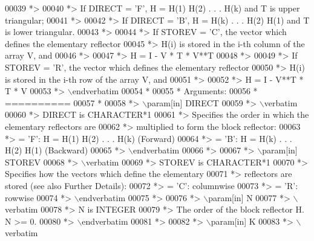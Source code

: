 \begin{DoxyCode}
00039 \textcolor{comment}{*>}
00040 \textcolor{comment}{*> If DIRECT = 'F', H = H(1) H(2) . . . H(k) and T is upper triangular;}
00041 \textcolor{comment}{*>}
00042 \textcolor{comment}{*> If DIRECT = 'B', H = H(k) . . . H(2) H(1) and T is lower triangular.}
00043 \textcolor{comment}{*>}
00044 \textcolor{comment}{*> If STOREV = 'C', the vector which defines the elementary reflector}
00045 \textcolor{comment}{*> H(i) is stored in the i-th column of the array V, and}
00046 \textcolor{comment}{*>}
00047 \textcolor{comment}{*>    H  =  I - V * T * V**T}
00048 \textcolor{comment}{*>}
00049 \textcolor{comment}{*> If STOREV = 'R', the vector which defines the elementary reflector}
00050 \textcolor{comment}{*> H(i) is stored in the i-th row of the array V, and}
00051 \textcolor{comment}{*>}
00052 \textcolor{comment}{*>    H  =  I - V**T * T * V}
00053 \textcolor{comment}{*> \(\backslash\)endverbatim}
00054 \textcolor{comment}{*}
00055 \textcolor{comment}{*  Arguments:}
00056 \textcolor{comment}{*  ==========}
00057 \textcolor{comment}{*}
00058 \textcolor{comment}{*> \(\backslash\)param[in] DIRECT}
00059 \textcolor{comment}{*> \(\backslash\)verbatim}
00060 \textcolor{comment}{*>          DIRECT is CHARACTER*1}
00061 \textcolor{comment}{*>          Specifies the order in which the elementary reflectors are}
00062 \textcolor{comment}{*>          multiplied to form the block reflector:}
00063 \textcolor{comment}{*>          = 'F': H = H(1) H(2) . . . H(k) (Forward)}
00064 \textcolor{comment}{*>          = 'B': H = H(k) . . . H(2) H(1) (Backward)}
00065 \textcolor{comment}{*> \(\backslash\)endverbatim}
00066 \textcolor{comment}{*>}
00067 \textcolor{comment}{*> \(\backslash\)param[in] STOREV}
00068 \textcolor{comment}{*> \(\backslash\)verbatim}
00069 \textcolor{comment}{*>          STOREV is CHARACTER*1}
00070 \textcolor{comment}{*>          Specifies how the vectors which define the elementary}
00071 \textcolor{comment}{*>          reflectors are stored (see also Further Details):}
00072 \textcolor{comment}{*>          = 'C': columnwise}
00073 \textcolor{comment}{*>          = 'R': rowwise}
00074 \textcolor{comment}{*> \(\backslash\)endverbatim}
00075 \textcolor{comment}{*>}
00076 \textcolor{comment}{*> \(\backslash\)param[in] N}
00077 \textcolor{comment}{*> \(\backslash\)verbatim}
00078 \textcolor{comment}{*>          N is INTEGER}
00079 \textcolor{comment}{*>          The order of the block reflector H. N >= 0.}
00080 \textcolor{comment}{*> \(\backslash\)endverbatim}
00081 \textcolor{comment}{*>}
00082 \textcolor{comment}{*> \(\backslash\)param[in] K}
00083 \textcolor{comment}{*> \(\backslash\)verbatim}

\end{DoxyCode}
